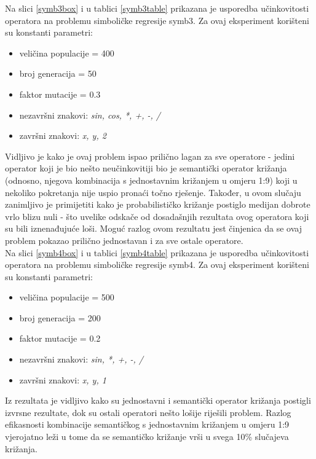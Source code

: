 Na slici \ref{symb3box} i u tablici \ref{symb3table} prikazana je usporedba učinkovitosti operatora na problemu simboličke regresije symb3. Za ovaj eksperiment korišteni su konstanti parametri:
\begin{itemize}
\item{veličina populacije = 400}
\item{broj generacija = 50}
\item{faktor mutacije = 0.3}
\item{nezavršni znakovi: \textit{sin, cos, *, +, -, /}}
\item{završni znakovi: \textit{x, y, 2}}
\end{itemize} 

Vidljivo je kako je ovaj problem ispao prilično lagan za sve operatore - jedini operator koji je bio nešto neučinkovitiji bio je semantički operator križanja (odnosno, njegova kombinacija s jednostavnim križanjem u omjeru 1:9) koji u nekoliko pokretanja nije uspio pronaći točno rješenje. Također, u ovom slučaju zanimljivo je primijetiti kako je probabilističko križanje postiglo medijan dobrote vrlo blizu nuli - što uvelike odskače od dosadašnjih rezultata ovog operatora koji su bili iznenađujuće loši. Moguć razlog ovom rezultatu jest činjenica da se ovaj problem pokazao prilično jednostavan i za sve ostale operatore.
\\

Na slici \ref{symb4box} i u tablici \ref{symb4table} prikazana je usporedba učinkovitosti operatora na problemu simboličke regresije symb4. Za ovaj eksperiment korišteni su konstanti parametri:
\begin{itemize}
\item{veličina populacije = 500}
\item{broj generacija = 200}
\item{faktor mutacije = 0.2}
\item{nezavršni znakovi: \textit{sin, *, +, -, /}}
\item{završni znakovi: \textit{x, y, 1}}
\end{itemize} 

Iz rezultata je vidljivo kako su jednostavni i semantički operator križanja postigli izvrsne rezultate, dok su ostali operatori nešto lošije riješili problem. Razlog efikasnosti kombinacije semantičkog s jednostavnim križanjem u omjeru 1:9 vjerojatno leži u tome da se semantičko križanje vrši u svega 10\% slučajeva križanja.


